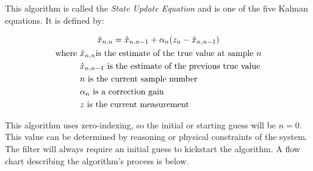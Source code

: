         This algorithm is called the \textit{State Update Equation} and is one of the five Kalman equations. 
        It is defined by:

        \begin{gather} \labeq{state_update_eq}
            \hat{x}_{n,n} = \hat{x}_{n,n-1} + \alpha_n(z_n - \hat{x}_{n,n-1}) \\
            \begin{aligned}
                \text{where } &\hat{x}_{n,n} \text{is the estimate of the true value at sample $n$} \\
                &\hat{x}_{n,n-1} \text{ is the estimate of the previous true value} \\
                &n \text{ is the current sample number} \\
                &\alpha_n \text{ is a correction gain} \\
                &z \text{ is the current measurement} \\
            \end{aligned} \notag
        \end{gather}



        This algorithm uses zero-indexing, so the initial or starting guess will be $n=0$.
        This value can be determined by reasoning or physical constraints of the system.
        The filter will always require an initial guess to kickstart the algorithm.
        A flow chart describing the algorithm's process is below.

        

